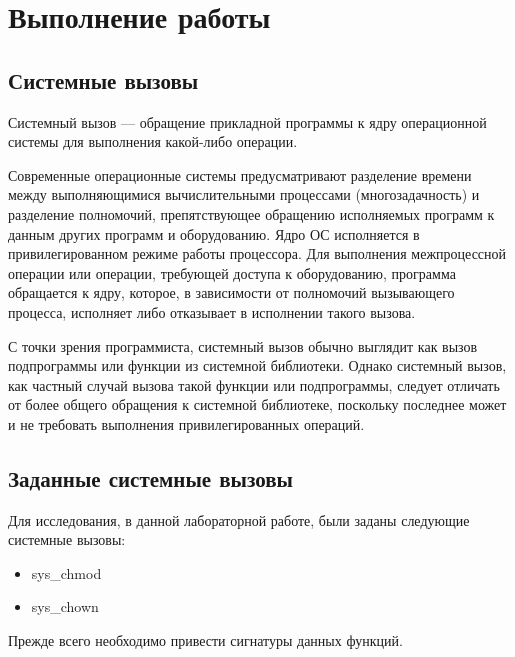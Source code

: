 \clearpage

\section{Выполнение работы}

\subsection{Системные вызовы} %

\par Системный вызов — обращение прикладной программы к ядру операционной системы для выполнения какой-либо операции.

\par Современные операционные системы предусматривают разделение времени между выполняющимися вычислительными процессами (многозадачность) и разделение полномочий, препятствующее обращению исполняемых программ к данным других программ и оборудованию. Ядро ОС исполняется в привилегированном режиме работы процессора. Для выполнения межпроцессной операции или операции, требующей доступа к оборудованию, программа обращается к ядру, которое, в зависимости от полномочий вызывающего процесса, исполняет либо отказывает в исполнении такого вызова.

\par С точки зрения программиста, системный вызов обычно выглядит как вызов подпрограммы или функции из системной библиотеки. Однако системный вызов, как частный случай вызова такой функции или подпрограммы, следует отличать от более общего обращения к системной библиотеке, поскольку последнее может и не требовать выполнения привилегированных операций.

\subsection{Заданные системные вызовы} %

\par Для исследования, в данной лабораторной работе, были заданы следующие системные вызовы:

\begin{itemize}
    \item sys\_chmod 
    \item sys\_chown
\end{itemize}


\par Прежде всего необходимо привести сигнатуры данных функций.

